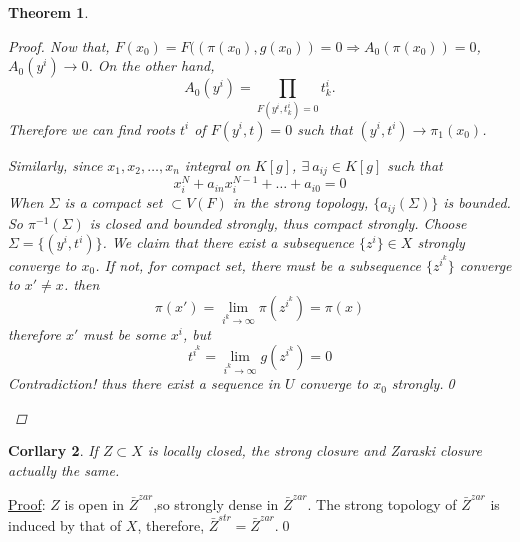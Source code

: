 \documentclass[a4paper]{article}
\newtheorem{thm}{Theorem}
\newtheorem{cor}[thm]{Corllary}
\theoremstyle{definition}
\theoremstyle{remark}
\begin{document}
\begin{thm}
\begin{proof}
      Now that, $F(x_0)=F((\pi(x_0),g(x_0))=0 \Rightarrow A_0(\pi(x_0))=0$, $A_0(y^i) \rightarrow 0$. On the other hand,
                     \[A_0(y^i)=\prod_{F(y^i,t^i_k)=0}{t^i_k}.\]
      Therefore we can find roots $t^i$ of $F(y^i,t)=0$ such that  $ (y^i,t^i) \rightarrow \pi_1(x_0)$.
        \begin{spacing}{1.2}
            Similarly, since $x_1,x_2,\dots,x_n$ integral on $K[g]$, $\exists \ a_{ij}\in K[g] $ such that
                    \[ x_i^N+a_{in}x_i^{N-1}+\dots+a_{i0}=0\]
            When $\Sigma$ is a compact set $\subset V(F)$ in the strong topology, $\{a_{ij}(\Sigma)\}$ is bounded. So $\pi^{-1}(\Sigma)$ is closed and bounded strongly, thus compact strongly. Choose $\Sigma=\{(y^i,t^i)\}$. We claim that there exist a subsequence $\{z^i\} \in X$ strongly converge to $x_0$. If not, for compact set, there must be a subsequence $\{z^{i^k}\}$ converge to $x' \not =x$. then \[\pi(x')=\lim_{i^k \rightarrow \infty} \pi(z^{i^k})=\pi(x)\] therefore $x'$ must be some $x^i$, but\[t^{i^k}=\lim_{i^k \rightarrow \infty} g(z^{i^k})=0\]
\emph{Contradiction!} thus there exist a sequence in $U$ converge to $x_0$ strongly.\qed
\end{spacing}
\end{proof}
\end{thm}


\begin{cor}
If $Z \subset X$ is locally closed, the strong closure and Zaraski closure actually the same.
\end{cor}
  \noindent\underline{Proof}: $Z$ is open in $\bar{Z}^{zar}$,so strongly dense in $\bar{Z}^{zar}$. The strong topology of $\bar{Z}^{zar}$ is induced by that of $X$, therefore, $\bar{Z}^{str}=\bar{Z}^{zar}$.\qed
\end{document}

